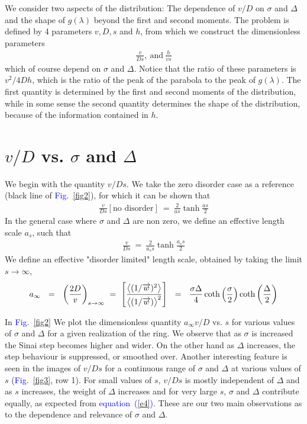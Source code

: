 \documentclass[aps,pre,floats,floatfix,fleqn]{revtex4}
\newcommand{\mylabel}[1]{\label{#1}}  %
\newcommand{\beq}{\begin{eqnarray}}
\newcommand{\eeq}{\end{eqnarray}}
\newcommand{\be}[1]{\begin{eqnarray}\ifthenelse{#1=-1}{\nonumber}{\ifthenelse{#1=0}{}{\mylabel{e#1}}}}
\newcommand{\ee}{\end{eqnarray}}
\newcommand{\Eq}[1]{\textcolor{blue}{equation~(\ref{#1})}} %
\newcommand{\Fig}[1] {\textcolor{blue}{Fig.~\ref{#1}}} %
\newcommand{\ora}{\protect\overrightarrow}
\begin{document}
We consider two aspects of the distribution: The dependence of $v/D$ on $\sigma$ and $\Delta$
and the shape of $g(\lambda)$ beyond the first and second moments. 
%
The problem is defined by 4 parameters $v,D,s$ and $h$, from which we construct the dimensionless parameters
%
\beq
\frac{v}{Ds}, \ \text{and} \  \frac{h}{vs}
\eeq
%
which of course depend on $\sigma$ and $\Delta$.
Notice that  the ratio of these parameters is $v^2/4Dh$, which is the ratio of the peak of the parabola to the peak of $g(\lambda)$.
%
The first quantity is determined by the first and second moments of the distribution,
while in some sense the second quantity determines the shape of the distribution, because of
 the information contained in $h$.


\section{$v/D$ vs. $\sigma$ and $\Delta$}
We begin with the quantity $v/Ds$. We take the zero disorder case as a reference (black line of \Fig{fig2}),
for which it can be shown that
%
\beq
\frac{v}{Ds} [\text{no disorder}] \ =\  \frac{2}{as} \tanh\frac{as}{2}
\eeq
%
In the general case where $\sigma$ and $\Delta$ are non zero, 
we define an effective length scale $a_s$, such that 
%
\beq
\frac{v}{Ds} \ =\  \frac{2}{a_s s} \tanh\frac{a_s s}{2}
\eeq
%
We define an effective "disorder limited" length scale, obtained by taking the limit $s\to \infty$,
%
\be{4}
a_{\infty} \ \ = \ \  \left(\frac{2D}{v}\right)_{s\rightarrow\infty} \ = \ 
\left[\frac{\big\langle (1/\ora{w})^2 \big\rangle}{\big\langle (1/\ora{w}) \big\rangle^2}\right]
\ \  = \  \ \frac{\sigma \Delta}{4} \coth\left( \frac{\sigma}{2} \right)\coth\left( \frac{\Delta}{2} \right)
\ee
%

In \Fig{fig2}
We plot the dimensionless quantity $a_{\infty}v/D$ vs. $s$ for various values of $\sigma$ and $\Delta$
for a given realization of the ring.
We observe that as $\sigma$ is increased the Sinai step becomes higher and wider. 
On the other hand as $\Delta$ increases, the step behaviour is suppressed, or smoothed over.
%
Another interesting feature is seen in the images of $v/Ds$ for a continuous range of $\sigma$ and $\Delta$ at various values of $s$ (\Fig{fig3}, row 1).
For small values of $s$, $v/Ds$ is mostly independent of $\Delta$ and 
as $s$ increases, the weight of $\Delta$ increases and for very large $s$, $\sigma$ and $\Delta$ contribute equally, as expected from \Eq{e4}.
These are our two main observations as to the dependence and relevance of $\sigma$ and $\Delta$. 
\end{document}
